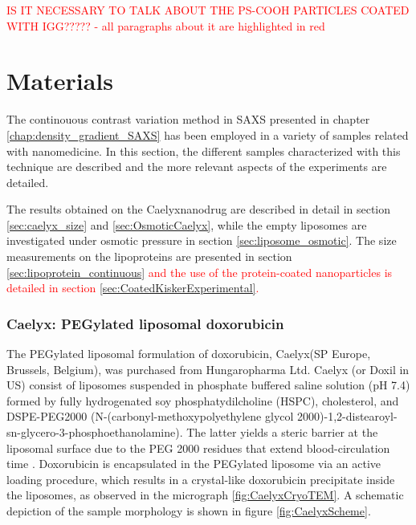 \textcolor{red}{IS IT NECESSARY TO TALK ABOUT THE PS-COOH PARTICLES COATED WITH IGG????? - all paragraphs about it are highlighted in red}


\section{Materials}

The continouous contrast variation method in SAXS presented in chapter \ref{chap:density_gradient_SAXS} has been employed in a variety of samples related with nanomedicine. In this section, the different samples characterized with this technique are described and the more relevant aspects of the experiments are detailed. 

The results obtained on the Caelyx\textregistered nanodrug are described in detail in section \ref{sec:caelyx_size} and \ref{sec:OsmoticCaelyx}, while the empty liposomes are investigated under osmotic pressure in section \ref{sec:liposome_osmotic}. The size measurements on the lipoproteins are presented in section \ref{sec:lipoprotein_continuous} \textcolor{red}{and the use of the protein-coated nanoparticles is detailed in section \ref{sec:CoatedKiskerExperimental}.}

\subsubsection{Caelyx\textregistered: PEGylated liposomal doxorubicin}
\label{sec:materials_caelyx}
The PEGylated liposomal formulation of doxorubicin, Caelyx\textregistered (SP Europe, Brussels, Belgium), was purchased from Hungaropharma Ltd. Caelyx \textregistered (or Doxil \textregistered in US) consist of liposomes suspended in phosphate buffered saline solution (pH 7.4) formed by fully hydrogenated soy phosphatydilcholine (HSPC), cholesterol, and DSPE-PEG2000 (N-(carbonyl-methoxypolyethylene glycol 2000)-1,2-distearoyl-sn-glycero-3-phosphoethanolamine). The latter yields a steric barrier at the liposomal surface due to the PEG 2000 residues that extend blood-circulation time . Doxorubicin is encapsulated in the PEGylated liposome via an active loading procedure, which results in a crystal-like doxorubicin precipitate inside the liposomes, as observed in the micrograph \ref{fig:CaelyxCryoTEM}. A schematic depiction of the sample morphology is shown in figure \ref{fig:CaelyxScheme}. 

